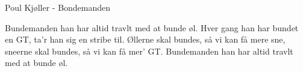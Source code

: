 {}
{Poul Kj\o ller - Bondemanden}
{
Bundemanden han har altid travlt
med at bunde øl.
Hver gang han har bundet en GT,
ta'r han sig en stribe til.
Øllerne skal bundes, så vi kan få mere sne,
sneerne skal bundes, så vi kan få mer' GT.
Bundemanden han har altid travlt
med at bunde øl.

}